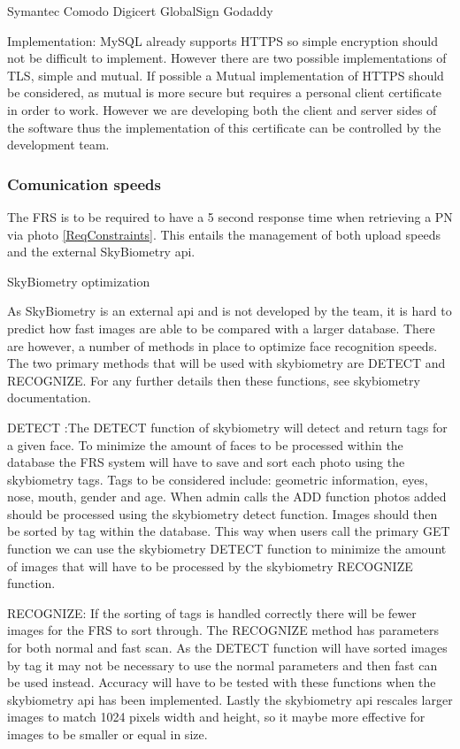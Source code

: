 \documentclass[a4paper,11pt]{article}
\begin{document}
Symantec
Comodo
Digicert
GlobalSign 
Godaddy

Implementation:
MySQL already supports HTTPS so simple encryption should not be difficult to implement. However there are two possible implementations of TLS, simple and mutual. If possible a Mutual implementation of HTTPS should be considered, as mutual is more secure but requires a personal client certificate in order to work. However we are developing both the client and server sides of the software thus the implementation of this certificate can be controlled by the development team.

\subsubsection{Comunication speeds}
 
The FRS is to be required to have a 5 second response time when retrieving a PN via photo \ref{ReqConstraints}. This entails the management of both upload speeds and the external SkyBiometry api.
 
SkyBiometry optimization
 
As SkyBiometry is an external api and is not developed by the team, it is hard to predict how fast images are able to be compared with a larger database. There are however, a number of methods in place to optimize face recognition speeds. The two primary methods that will be used with skybiometry are DETECT and RECOGNIZE. For any further details then these functions, see skybiometry documentation.
 
DETECT :The DETECT function of skybiometry will detect and return tags for a given face. To minimize the amount of faces to be processed within the database the FRS system will have to save and sort each photo using the skybiometry tags.
Tags to be considered include: geometric information, eyes, nose, mouth, gender and age.
When admin calls the ADD function photos added should be processed using the skybiometry detect function. Images should then be sorted by tag within the database. This way when users call the primary GET function we can use the skybiometry DETECT function to minimize the amount of images that will have to be processed by the skybiometry RECOGNIZE function.
 
RECOGNIZE: If the sorting of tags is handled correctly there will be fewer images for the FRS to sort through. The RECOGNIZE method has parameters for both normal and fast scan. As the DETECT function will have sorted images by tag it may not be necessary to use the normal parameters and then fast can be used instead. Accuracy will have to be tested with these functions when the skybiometry api has been implemented. Lastly the skybiometry api rescales larger images to match 1024 pixels width and height, so it maybe more effective for images to be smaller or equal in size. 
\end{document}
